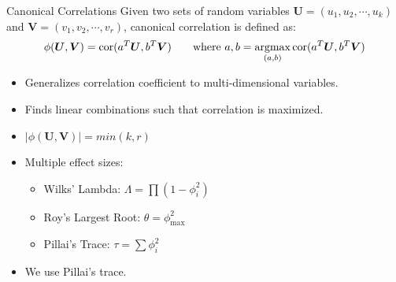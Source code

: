 \documentclass{beamer}
\DeclareMathOperator*{\argmax}{argmax}
\begin{document}

\begin{frame}{Canonical Correlations}
	Given two sets of random variables $ \bm{U} = (u_1, u_2, \cdots, u_k) $ and $ \bm{V} = (v_1, v_2, \cdots, v_r) $, canonical correlation is 
	defined as:
	\begin{equation*}
		\begin{split}
			\phi(\bm{U}, \bm{V}) &= \textnormal{cor}(a^T \bm{U}, b^T \bm{V}) \;\;\;\;\;\;\; \textnormal{where } a, b = \argmax_{(a, b)} \textnormal{cor}(a^T \bm{U}, b^T \bm{V}) \\
		\end{split}
	\end{equation*}
	\begin{itemize}
		\item Generalizes correlation coefficient to multi-dimensional variables.
		\item Finds linear combinations such that correlation is maximized.
		\item $ \rvert \phi(\bm{U}, \bm{V}) \rvert = min(k, r) $
		\item Multiple effect sizes:
			\begin{itemize}
				\item Wilks' Lambda: $ \Lambda = \prod (1 - \phi_i^2) $
				\item Roy's Largest Root: $ \theta = \phi_{\max}^2 $
				\item Pillai's Trace: $ \tau = \sum \phi_i^2 $
			\end{itemize}
		\item We use Pillai's trace.
	\end{itemize}
\end{frame}
\end{document}

